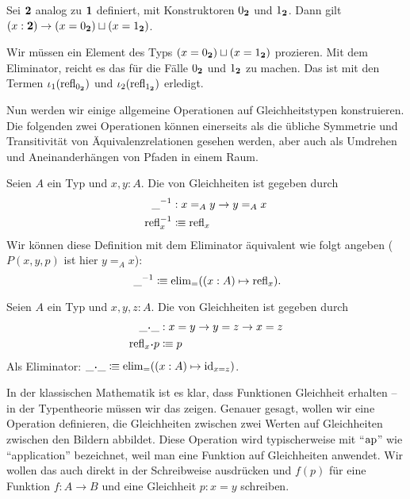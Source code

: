 \begin{bemerkung}
  Sei $\mathbf{2}$ analog zu $\mathbf{1}$ definiert, mit Konstruktoren $0_{\mathbf{2}}$ und $1_{\mathbf{2}}$.
  Dann gilt $(x:\mathbf{2})\to (x=0_{\mathbf{2}})\sqcup (x=1_{\mathbf{2}})$.
\end{bemerkung}
\begin{beweis}
  Wir müssen ein Element des Typs $(x=0_{\mathbf{2}})\sqcup (x=1_{\mathbf{2}})$ prozieren.
  Mit dem Eliminator, reicht es das für die Fälle $0_{\mathbf{2}}$ und $1_{\mathbf{2}}$ zu machen.
  Das ist mit den Termen $\iota_1(\mathrm{refl}_{0_{\mathbf{2}}})$ und $\iota_2(\mathrm{refl}_{1_{\mathbf{2}}})$ erledigt.
\end{beweis}

Nun werden wir einige allgemeine Operationen auf Gleichheitstypen konstruieren.
Die folgenden zwei Operationen können einerseits als die übliche Symmetrie und Transitivität von Äquivalenzrelationen gesehen werden, aber auch als Umdrehen und Aneinanderhängen von Pfaden in einem Raum.

\begin{definition}
  Seien $A$ ein Typ und $x,y:A$.
  Die  von Gleichheiten ist gegeben durch
  \begin{align*}
    \_^{-1} &: x=_Ay\to y=_Ax \\
    \mathrm{refl}_x^{-1}&\vcentcolon\mspace{-1.2mu}\equiv \mathrm{refl}_x 
  \end{align*}
  Wir können diese Definition mit dem Eliminator äquivalent wie folgt angeben ($P(x,y, p)$ ist hier $y=_Ax$):
  \[
     \_^{-1}\colonequiv \elim_=((x:A) \mapsto \refl_x)\rlap{.}
  \]
\end{definition}

\begin{definition}
  Seien $A$ ein Typ und $x,y,z:A$.
  Die  von Gleichheiten ist gegeben durch
  \begin{align*}
    \_\kon\_&:x=y\to y=z\to x=z \\
    \refl_x\kon p &\colonequiv  p
  \end{align*}
  Als Eliminator: $\_\kon\_\colonequiv \elim_=((x:A)\mapsto \id_{x=z})$.
\end{definition}

In der klassischen Mathematik ist es klar, dass Funktionen Gleichheit erhalten -- in der Typentheorie müssen wir das zeigen.
Genauer gesagt, wollen wir eine Operation definieren, die Gleichheiten zwischen zwei Werten auf Gleichheiten zwischen den Bildern abbildet.
Diese Operation wird typischerweise mit ``$\mathrm{ap}$'' wie ``application'' bezeichnet, weil man eine Funktion auf Gleichheiten anwendet. 
Wir wollen das auch direkt in der Schreibweise ausdrücken und $f( p)$ für eine Funktion $f:A\to B$ und eine Gleichheit $ p:x=y$ schreiben.

